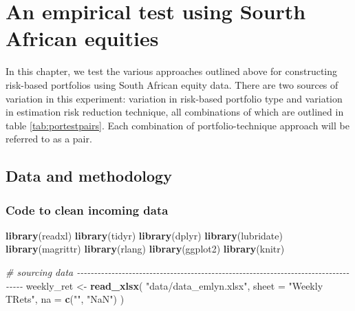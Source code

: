 \documentclass[
]{article}
\newenvironment{Shaded}{\begin{snugshade}}{\end{snugshade}}
\newcommand{\CommentTok}[1]{\textcolor[rgb]{0.56,0.35,0.01}{\textit{#1}}}
\newcommand{\DataTypeTok}[1]{\textcolor[rgb]{0.13,0.29,0.53}{#1}}
\newcommand{\KeywordTok}[1]{\textcolor[rgb]{0.13,0.29,0.53}{\textbf{#1}}}
\newcommand{\NormalTok}[1]{#1}
\newcommand{\StringTok}[1]{\textcolor[rgb]{0.31,0.60,0.02}{#1}}
\begin{document}
\hypertarget{experiment}{%
\section{An empirical test using Sourth African equities}\label{experiment}}

In this chapter, we test the various approaches outlined above for constructing risk-based portfolios
using South African equity data. There are two sources of variation in this experiment: variation in
risk-based portfolio type and variation in estimation risk reduction technique, all combinations of
which are outlined in table \ref{tab:portestpairs}. Each combination of portfolio-technique approach
will be referred to as a pair.

\hypertarget{data-and-methodology}{%
\subsection{Data and methodology}\label{data-and-methodology}}

\hypertarget{code-to-clean-incoming-data}{%
\subsubsection{Code to clean incoming data}\label{code-to-clean-incoming-data}}

\begin{Shaded}
\begin{Highlighting}[]
\KeywordTok{library}\NormalTok{(readxl)}
\KeywordTok{library}\NormalTok{(tidyr)}
\KeywordTok{library}\NormalTok{(dplyr)}
\KeywordTok{library}\NormalTok{(lubridate)}
\KeywordTok{library}\NormalTok{(magrittr)}
\KeywordTok{library}\NormalTok{(rlang)}
\KeywordTok{library}\NormalTok{(ggplot2)}
\KeywordTok{library}\NormalTok{(knitr)}

\CommentTok{\# sourcing data {-}{-}{-}{-}{-}{-}{-}{-}{-}{-}{-}{-}{-}{-}{-}{-}{-}{-}{-}{-}{-}{-}{-}{-}{-}{-}{-}{-}{-}{-}{-}{-}{-}{-}{-}{-}{-}{-}{-}{-}{-}{-}{-}{-}{-}{-}{-}{-}{-}{-}{-}{-}{-}{-}{-}{-}{-}{-}{-}{-}{-}{-}{-}{-}{-}{-}{-}{-}{-}{-}{-}{-}{-}{-}{-}{-}{-}{-}{-}{-}{-}{-}{-}{-}}
\NormalTok{weekly\_ret \textless{}{-}}\StringTok{ }\KeywordTok{read\_xlsx}\NormalTok{(}
  \StringTok{"data/data\_emlyn.xlsx"}\NormalTok{,}
  \DataTypeTok{sheet =} \StringTok{"Weekly TRets"}\NormalTok{,}
  \DataTypeTok{na =} \KeywordTok{c}\NormalTok{(}\StringTok{""}\NormalTok{, }\StringTok{"NaN"}\NormalTok{)}
\NormalTok{)}
\end{Highlighting}
\end{Shaded}
\end{document}
